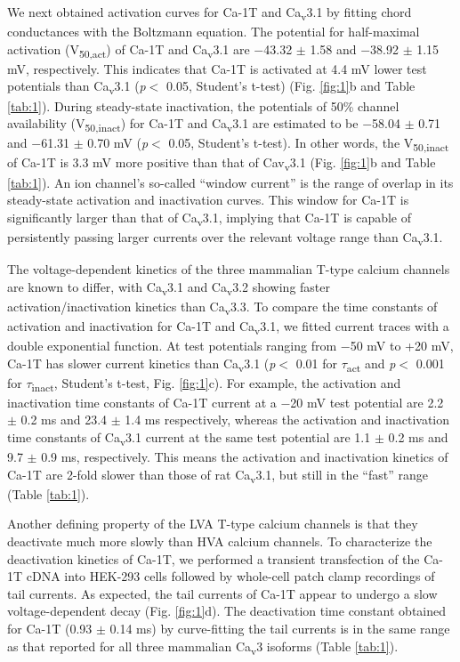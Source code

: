 We next obtained activation curves for Ca-\alpha1T and Ca\textsubscript{v}3.1 by fitting chord conductances with the Boltzmann equation. The potential for half-maximal activation (V\textsubscript{50,act}) of Ca-\alpha1T and Ca\textsubscript{v}3.1 are $-$43.32 $\pm$ 1.58 and $-$38.92 $\pm$ 1.15 mV, respectively. This indicates that Ca-\alpha1T is activated at 4.4 mV lower test potentials than Ca\textsubscript{v}3.1 (\emph{p}$<$ 0.05, Student's t-test) (Fig. \ref{fig:1}b and Table \ref{tab:1}).
During steady-state inactivation, the potentials of 50\% channel availability (V\textsubscript{50,inact}) for Ca-\alpha1T and Ca\textsubscript{v}3.1 are estimated to be $-$58.04 $\pm$ 0.71 and $-$61.31 $\pm$ 0.70 mV (\emph{p}$<$ 0.05, Student's t-test). In other words, the V\textsubscript{50,inact} of Ca-\alpha1T is 3.3 mV more positive than that of Cav\textsubscript{v}3.1 (Fig. \ref{fig:1}b and Table \ref{tab:1}).
An ion channel's so-called ``window current'' is the range of overlap in its steady-state activation and inactivation curves. This window for Ca-\alpha1T is significantly larger than that of Ca\textsubscript{v}3.1, implying that Ca-\alpha1T is capable of persistently passing larger currents over the relevant voltage range than Ca\textsubscript{v}3.1.

The voltage-dependent kinetics of the three mammalian T-type calcium channels are known to differ, with Ca\textsubscript{v}3.1 and Ca\textsubscript{v}3.2 showing faster activation/inactivation kinetics than Ca\textsubscript{v}3.3\cite{klockner:1999aa}.
To compare the time constants of activation and inactivation for Ca-\alpha1T and Ca\textsubscript{v}3.1, we fitted current traces with a double exponential function.
At test potentials ranging from $-$50 mV to +20 mV,  Ca-\alpha1T has slower current kinetics than Ca\textsubscript{v}3.1 (\emph{p}$<$ 0.01 for $\tau$\textsubscript{act} and \emph{p}$<$ 0.001 for $\tau$\textsubscript{inact}, Student's t-test, Fig. \ref{fig:1}c).
For example, the activation and inactivation time constants of Ca-\alpha1T current at a $-$20 mV test potential are 2.2 $\pm$ 0.2 ms and 23.4 $\pm$ 1.4 ms respectively, whereas the activation and inactivation time constants of Ca\textsubscript{v}3.1 current at the same test potential are 1.1 $\pm$ 0.2 ms and 9.7 $\pm$ 0.9 ms, respectively. This means the activation and inactivation kinetics of Ca-\alpha1T are 2-fold slower than those of rat Ca\textsubscript{v}3.1, but still in the ``fast'' range (Table \ref{tab:1}).

Another defining property of the LVA T-type calcium channels is that they deactivate much more slowly than HVA calcium channels\cite{PerezReyes:1998gn,lee:1999aa,matteson:1986aa}. 
To characterize the deactivation kinetics of Ca-\alpha1T, we performed a transient transfection of the Ca-\alpha1T cDNA into HEK-293 cells followed by whole-cell patch clamp recordings of tail currents.
As expected, the tail currents of Ca-\alpha1T appear to undergo a slow voltage-dependent decay (Fig. \ref{fig:1}d).
The deactivation time constant obtained for Ca-\alpha1T (0.93 $\pm$ 0.14 ms) by curve-fitting the tail currents is in the same range as that reported for all three mammalian Ca\textsubscript{v}3 isoforms (Table \ref{tab:1}). 

